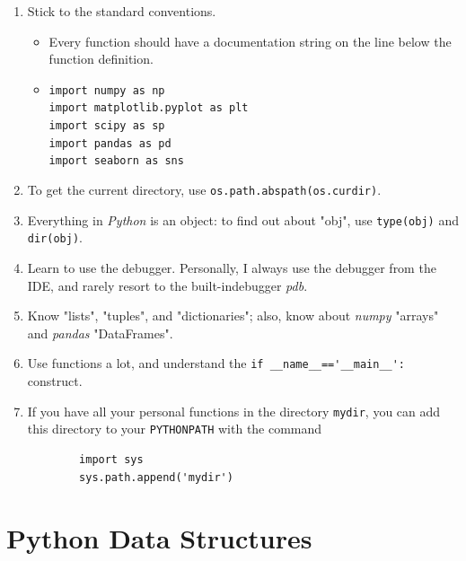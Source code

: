 \begin{enumerate}
  \item Stick to the standard conventions.
      \begin{itemize}
        \item Every function should have a documentation string on the line below the function definition.
        \item \lstinline{import numpy as np}\\
            \lstinline{import matplotlib.pyplot as plt}\\
            \lstinline{import scipy as sp}\\
            \lstinline{import pandas as pd}\\
            \lstinline{import seaborn as sns}
      \end{itemize}
  \item To get the current directory, use \lstinline{os.path.abspath(os.curdir)}.
  \item Everything in \emph{Python} is an object: to find out about "obj", use \lstinline{type(obj)} and \lstinline{dir(obj)}.
  \item Learn to use the debugger. Personally, I always use the debugger from the IDE, and rarely resort to the built-indebugger \emph{pdb}.
  \item Know "lists", "tuples", and "dictionaries"; also, know about \emph{numpy} "arrays" and \emph{pandas} "DataFrames".
  \item Use functions a lot, and understand the \lstinline{if __name__=='__main__':} construct.
  \item If you have all your personal functions in the directory \lstinline{mydir}, you can add this directory to your \lstinline{PYTHONPATH} with the command
      \begin{lstlisting}
        import sys
        sys.path.append('mydir')
      \end{lstlisting}
\end{enumerate}

\section{Python Data Structures}

